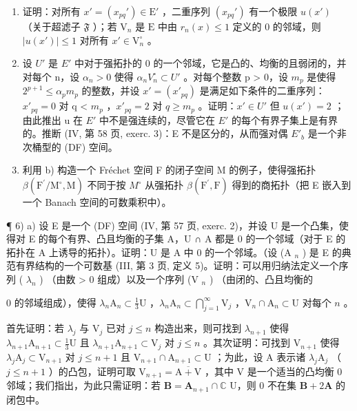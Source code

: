 \begin{enumerate}
\def\labelenumi{\alph{enumi})}
\item
  证明：对所有 \(x' = (x_{pq}') \in \mathrm{E}'\) ，二重序列 \((x_{pq}')\) 有一个极限 \(u(x')\) （关于超滤子 \(\mathfrak{F}\) ）；若 \(\mathrm{V}_n\) 是 \(\mathrm{E}\) 中由 \(r_n(x) \leqslant 1\) 定义的 0 的邻域，则 \(|u(x')| \leqslant 1\) 对所有 \(x' \in \mathrm{V}_n^\circ\) 。
\item
  设 \(U'\) 是 \(E'\) 中对于强拓扑的 0 的一个邻域，它是凸的、均衡的且弱闭的，并对每个 n，设 \(\alpha_{n} > 0\) 使得 \(\alpha_{n} V_{n}^{\circ} \subset U'\) 。对每个整数 p \textgreater{} 0，设 \(m_{p}\) 是使得 \(2^{p+1} \leqslant \alpha_{p} m_{p}\) 的整数，并设 \(x' = (x'_{pq})\) 是满足如下条件的二重序列：\(x'_{pq} = 0\) 对 q \textless{} \(m_{p}\) ，\(x'_{pq} = 2\) 对 \(q \geqslant m_{p}\) 。证明：\(x' \in U'\) 但 \(u(x') = 2\) ；由此推出 u 在 \(E'\) 中不是强连续的，尽管它在 \(E'\) 的每个有界子集上是有界的。推断 (IV, 第 58 页, exerc. 3)：E 不是区分的，从而强对偶 \(E'_{b}\) 是一个非次桶型的 (DF) 空间。
\item
  利用 b) 构造一个 Fréchet 空间 F 的闭子空间 M 的例子，使得强拓扑 \(\beta(\mathrm{F}^{\prime}/\mathrm{M}^{\circ}, \mathrm{M})\) 不同于按 \(M^{\circ}\) 从强拓扑 \(\beta(\mathrm{F}^{\prime}, \mathrm{F})\) 得到的商拓扑（把 E 嵌入到一个 Banach 空间的可数乘积中）。
\end{enumerate}

¶ 6) a) 设 E 是一个 (DF) 空间 (IV, 第 57 页, exerc. 2)，并设 U 是一个凸集，使得对 E 的每个有界、凸且均衡的子集 A，U ∩ A 都是 0 的一个邻域（对于 E 的拓扑在 A 上诱导的拓扑）。证明：U 是 A 中 0 的一个邻域。（设 (A \(_{n}\) ) 是 E 的典范有界结构的一个可数基 (III, 第 3 页, 定义 5)。证明：可以用归纳法定义一个序列 ( \(\lambda_{n}\) ) （由数 \textgreater{} 0 组成）以及一个序列 (V \(_{n}\) ) （由闭的、凸且均衡的

0 的邻域组成），使得 \(\lambda_{n}\mathrm{A}_{n} \subset \frac{1}{3}\mathrm{U}\) ，\(\lambda_{n}\mathrm{A}_{n} \subset \bigcap_{j=1}^{\infty} \mathrm{V}_{j}\) ，\(\mathrm{V}_{n} \cap \mathrm{A}_{n} \subset \mathrm{U}\) 对每个 \(n\) 。

首先证明：若 \(\lambda_{j}\) 与 \(\mathrm{V}_j\) 已对 \(j\leqslant n\) 构造出来，则可找到 \(\lambda_{n + 1}\) 使得 \(\lambda_{n + 1}\mathrm{A}_{n + 1}\subset \frac{1}{3}\mathrm{U}\) 且 \(\lambda_{n + 1}\mathrm{A}_{n + 1}\subset \mathrm{V}_j\) 对 \(j\leqslant n\) 。其次证明：可找到 \(\mathrm{V}_{n + 1}\) 使得 \(\lambda_j\mathrm{A}_j\subset \mathrm{V}_{n + 1}\) 对 \(j\leqslant n + 1\) 且 \(\mathrm{V}_{n + 1}\cap \mathrm{A}_{n + 1}\subset \mathrm{U}\) ；为此，设 A 表示诸 \(\lambda_{j}\mathrm{A}_{j}\) （\(j\leqslant n + 1\) ）的凸包，证明可取 \(\mathrm{V}_{n + 1} = \overline{\mathrm{A} + \mathrm{V}}\) ，其中 V 是一个适当的凸均衡 0 邻域；我们指出，为此只需证明：若 \(\mathbf{B} = \mathbf{A}_{n + 1}\cap \mathbb{C}\) U，则 0 不在集 \(\mathbf{B} + 2\mathbf{A}\) 的闭包中。


